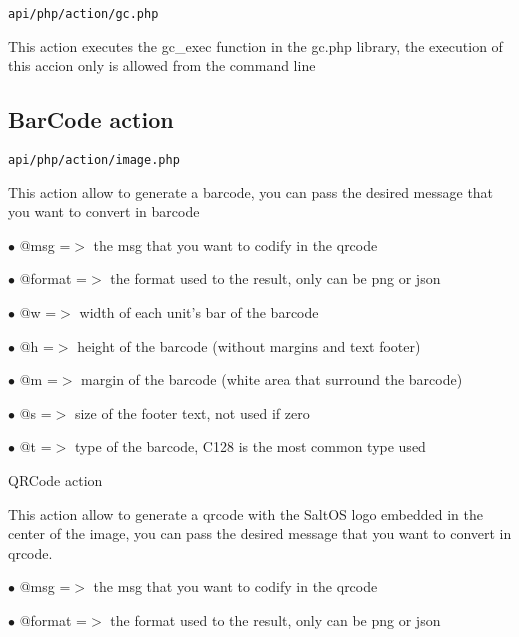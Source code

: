 \documentclass[a4paper]{article}
\begin{document}
\begin{lstlisting}
api/php/action/gc.php
\end{lstlisting}

This action executes the gc\_exec function in the gc.php library, the execution
of this accion only is allowed from the command line

\hypertarget{toc7}{}
\subsection{BarCode action}

\begin{lstlisting}
api/php/action/image.php
\end{lstlisting}

This action allow to generate a barcode, you can pass the desired
message that you want to convert in barcode

\begin{compactitem}
\item[\color{myblue}$\bullet$] @msg    =$>$ the msg that you want to codify in the qrcode
\item[\color{myblue}$\bullet$] @format =$>$ the format used to the result, only can be png or json
\end{compactitem}

\begin{compactitem}
\item[\color{myblue}$\bullet$] @w =$>$ width of each unit's bar of the barcode
\item[\color{myblue}$\bullet$] @h =$>$ height of the barcode (without margins and text footer)
\item[\color{myblue}$\bullet$] @m =$>$ margin of the barcode (white area that surround the barcode)
\item[\color{myblue}$\bullet$] @s =$>$ size of the footer text, not used if zero
\item[\color{myblue}$\bullet$] @t =$>$ type of the barcode, C128 is the most common type used
\end{compactitem}

QRCode action

This action allow to generate a qrcode with the SaltOS logo embedded
in the center of the image, you can pass the desired message that you
want to convert in qrcode.

\begin{compactitem}
\item[\color{myblue}$\bullet$] @msg    =$>$ the msg that you want to codify in the qrcode
\item[\color{myblue}$\bullet$] @format =$>$ the format used to the result, only can be png or json
\end{compactitem}
\end{document}
